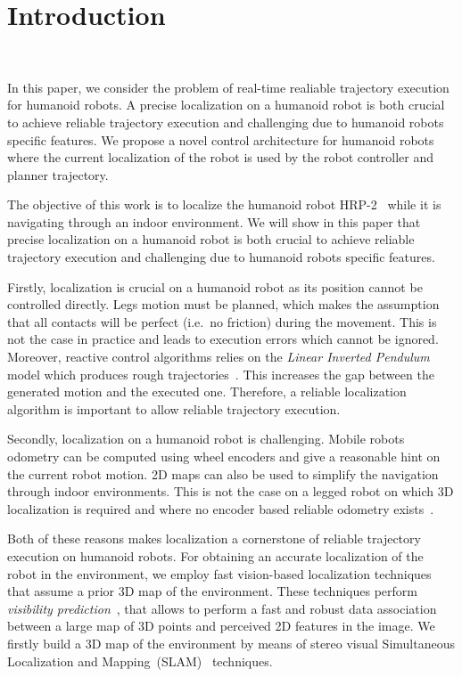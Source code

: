 \section{Introduction}~\label{sec:introduction}

In this paper, we consider the problem of real-time realiable
trajectory execution for humanoid robots. A precise localization on a
humanoid robot is both crucial to achieve reliable trajectory
execution and challenging due to humanoid robots specific features. We
propose a novel control architecture for humanoid robots where the
current localization of the robot is used by the robot controller and
planner trajectory.

The objective of this work is to localize the humanoid robot
HRP-2~\cite{Kaneko04icra} while it is navigating through an indoor
environment. We will show in this paper that precise localization on a
humanoid robot is both crucial to achieve reliable trajectory
execution and challenging due to humanoid robots specific features.

Firstly, localization is crucial on a humanoid robot as its position
cannot be controlled directly. Legs motion must be planned, which
makes the assumption that all contacts will be perfect (i.e.\ no
friction) during the movement. This is not the case in practice and
leads to execution errors which cannot be ignored. Moreover, reactive
control algorithms relies on the \textit{Linear Inverted Pendulum}
model which produces rough trajectories~\cite{Kajita01iros}. This
increases the gap between the generated motion and the executed
one. Therefore, a reliable localization algorithm is important to
allow reliable trajectory execution.

Secondly, localization on a humanoid robot is challenging. Mobile
robots odometry can be computed using wheel encoders and give a
reasonable hint on the current robot motion. 2D maps can also be used
to simplify the navigation through indoor environments. This is not
the case on a legged robot on which 3D localization is required and
where no encoder based reliable odometry exists~\citep{Hornung10iros}.

Both of these reasons makes localization a cornerstone of reliable
trajectory execution on humanoid robots. For obtaining an accurate
localization of the robot in the environment, we employ fast
vision-based localization techniques~\cite{Alcantarilla10icra} that
assume a prior 3D map of the environment. These techniques perform
\textit{visibility prediction}~\cite{Alcantarilla11icra}, that allows
to perform a fast and robust data association between a large map of
3D points and perceived 2D features in the image. We firstly build a
3D map of the environment by means of stereo visual Simultaneous
Localization and Mapping~(SLAM)~\cite{Davison07pami,Konolige08tro}
techniques.

